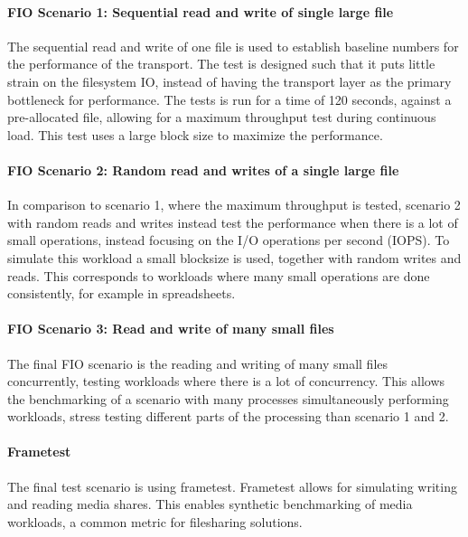 \documentclass[english, 12pt, a4paper, elec, utf8, a-2b, online]{aaltothesis}
\begin{document}
\paragraph{FIO Scenario 1: Sequential read and write of single large file}

The sequential read and write of one file is used to establish baseline numbers
for the performance of the transport. The test is designed such that it puts little
strain on the filesystem IO, instead of having the transport layer as the primary 
bottleneck for performance. The tests is run for a time of 120 seconds, against a
pre-allocated file, allowing for a maximum throughput test during continuous load.
This test uses a large block size to maximize the performance.

\paragraph{FIO Scenario 2: Random read and writes of a single large file}

In comparison to scenario 1, where the maximum throughput is tested, scenario 2
with random reads and writes instead test the performance when there is a lot of
small operations, instead focusing on the I/O operations per second (IOPS). To simulate
this workload a small blocksize is used, together with random writes and reads. This corresponds
to workloads where many small operations are done consistently, for example in
spreadsheets.

\paragraph{FIO Scenario 3: Read and write of many small files}

The final FIO scenario is the reading and writing of many small files concurrently,
testing workloads where there is a lot of concurrency. This allows the benchmarking
of a scenario with many processes simultaneously performing workloads, stress
testing different parts of the processing than scenario 1 and 2.

\paragraph{Frametest}

The final test scenario is using frametest. Frametest allows for simulating
writing and reading media shares. This enables synthetic benchmarking of media
workloads, a common metric for filesharing solutions.
\end{document}
